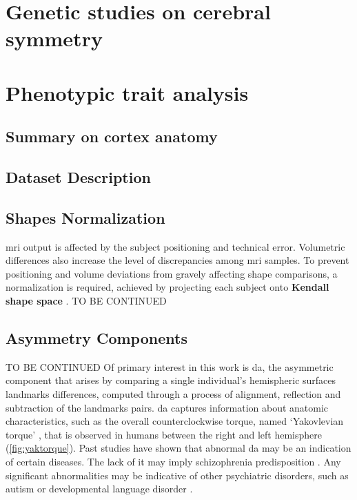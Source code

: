 \section{Genetic studies on cerebral symmetry}






\section{Phenotypic trait analysis}\label{sec:phenotype_intro}
\subsection{Summary on cortex anatomy}
 
\subsection{Dataset Description}
 
\subsection{Shapes Normalization}
\Ac{mri} output is affected by the subject positioning and technical error.  Volumetric differences also increase the level of discrepancies among \ac{mri} samples. To prevent positioning and volume deviations from gravely affecting shape comparisons, a normalization is required, achieved by projecting each subject onto \textbf{Kendall shape space} \cite{Klingenberg2020}. TO BE CONTINUED

 
\subsection{Asymmetry Components}
TO BE CONTINUED
Of primary interest in this work is \ac{da}, the asymmetric component that arises by comparing a single individual's hemispheric surfaces landmarks differences, computed through a process of alignment, reflection and subtraction of the landmarks pairs. \ac{da} captures information about anatomic characteristics, such as the overall counterclockwise torque, named `Yakovlevian torque' \cite{LeMay1976}, that is observed in humans between the right and left hemisphere (\autoref{fig:yaktorque}). Past studies have shown that abnormal \ac{da} may be an indication of certain diseases. The lack of it may imply schizophrenia predisposition \cite{Ribolsi2014}. Any significant abnormalities may be indicative of other psychiatric disorders, such as autism or developmental language disorder \cite{Herbert2005}\cite{Kong2022}. 

